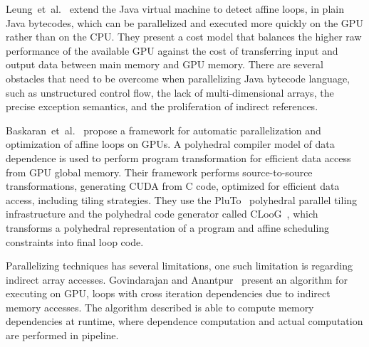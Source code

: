\documentclass[a4paper,12pt]{article}
\newcommand{\etal}{et~al.}
\begin{document}
Leung~\etal~\cite{leung09} extend the Java virtual machine to detect affine
loops, in plain Java bytecodes, which can be parallelized and executed more
quickly on the GPU rather than on the CPU.  They present a cost model that
balances the higher raw performance of the available GPU against the cost of
transferring input and output data between main memory and GPU memory.  There
are several obstacles that need to be overcome when parallelizing Java bytecode
language, such as unstructured control flow, the lack of multi-dimensional
arrays, the precise exception semantics, and the proliferation of indirect
references.

Baskaran~\etal~\cite{baskaran08,baskaran10} propose a framework for automatic
parallelization and optimization of affine loops on GPUs. A polyhedral compiler
model of data dependence is used to perform program transformation for
efficient data access from GPU global memory.  Their framework performs
source-to-source transformations, generating CUDA from C code, optimized for
efficient data access, including tiling strategies.  They use the
PluTo~\cite{bondhugula08} polyhedral parallel tiling infrastructure and the
polyhedral code generator called CLooG~\cite{bastoul04}, which transforms a
polyhedral representation of a program and affine scheduling constraints into
final loop code.

Parallelizing techniques has several limitations, one such limitation is
regarding indirect array accesses.  Govindarajan and
Anantpur~\cite{govindarajan13} present an algorithm for executing on GPU, loops
with cross iteration dependencies due to indirect memory accesses.  The
algorithm described is able to compute memory dependencies at runtime, where
dependence computation and actual computation are performed in pipeline.

%
\end{document}
